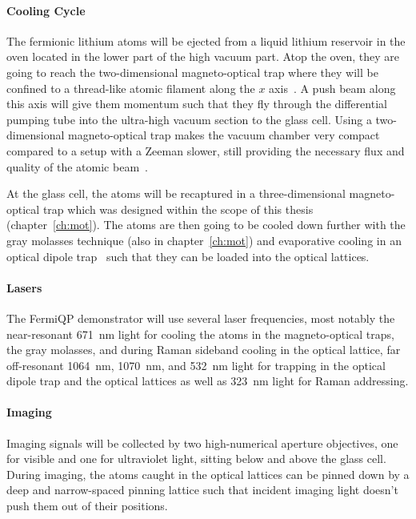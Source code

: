 \paragraph{Cooling Cycle}
The fermionic lithium atoms will be ejected from a liquid lithium reservoir in the oven located in the lower part of the high vacuum part. Atop the oven, they are going to reach the two-dimensional magneto-optical trap where they will be confined to a thread-like atomic filament along the $x$ axis~\cite{qesja_notitle_2022}.  A push beam along this axis will give them momentum such that they fly through the differential pumping tube into the ultra-high vacuum section to the glass cell. Using a two-dimensional magneto-optical trap makes the vacuum chamber very compact compared to a setup with a Zeeman slower, still providing the necessary flux and quality of the atomic beam~\cite{tiecke_high-flux_2009}.

At the glass cell, the atoms will be recaptured in a three-dimensional magneto-optical trap which was designed within the scope of this thesis (chapter~\ref{ch:mot}). The atoms are then going to be cooled down further with the gray molasses technique (also in chapter~\ref{ch:mot}) and evaporative cooling in an optical dipole trap~\cite{sun_construction_2022} such that they can be loaded into the optical lattices.

\paragraph{Lasers}
The FermiQP demonstrator will use several laser frequencies, most notably the near-resonant \SI[]{671}{\nano\meter} light for cooling the atoms in the magneto-optical traps, the gray molasses, and during Raman sideband cooling in the optical lattice, far off-resonant \SI[]{1064}{\nano\meter}, \SI[]{1070}{\nano\meter}, and \SI[]{532}{\nano\meter} light for trapping in the optical dipole trap and the optical lattices as well as \SI[]{323}{\nano\meter} light for Raman addressing.

\paragraph{Imaging}
Imaging signals will be collected by two high-numerical aperture objectives, one for visible and one for ultraviolet light, sitting below and above the glass cell. During imaging, the atoms caught in the optical lattices can be pinned down by a deep and narrow-spaced pinning lattice such that incident imaging light doesn't push them out of their positions.

